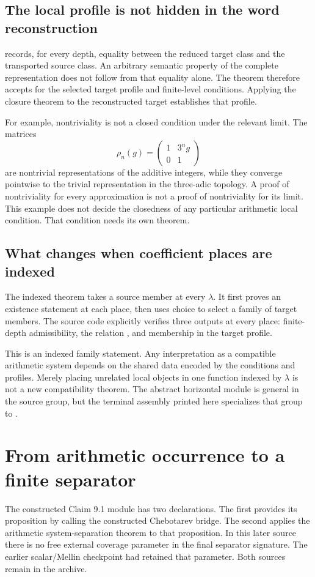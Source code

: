 \subsection{The local profile is not hidden in the word reconstruction}
 records, for every depth, equality between the reduced
target class and the transported source class. An arbitrary semantic property
of the complete representation does not follow from that equality alone.
The theorem therefore accepts  for the selected target
profile and finite-level conditions. Applying the closure theorem to the
reconstructed target establishes that profile.

For example, nontriviality is not a closed condition under the relevant limit.
The matrices
\[
 \rho_n(g)=\begin{pmatrix}1&3^n g\\0&1\end{pmatrix}
\]
are nontrivial representations of the additive integers, while they converge
pointwise to the trivial representation in the three-adic topology. A proof of
nontriviality for every approximation is not a proof of nontriviality for its limit.
This example does not decide the closedness of any particular arithmetic local
condition. That condition needs its own theorem.

\subsection{What changes when coefficient places are indexed}
The indexed theorem takes a source member at every $\lambda$. It first proves
an existence statement at each place, then uses choice to select a family of
target members. The source code explicitly verifies three outputs at every place:
finite-depth admissibility, the relation , and membership
in the target profile.

This is an indexed family statement. Any interpretation as a compatible
arithmetic system depends on the shared data encoded by the conditions and
profiles. Merely placing unrelated local objects in one function indexed by
$\lambda$ is not a new compatibility theorem. The abstract horizontal module is
general in the source group, but the terminal assembly printed here specializes
that group to .

\clearpage
\section{From arithmetic occurrence to a finite separator}
\label{sec:separator}
The constructed Claim 9.1 module has two declarations. The first provides its
 proposition by calling the constructed
Chebotarev bridge. The second applies the arithmetic system-separation theorem
to that proposition. In this later source there is no free external coverage
parameter in the final separator signature. The earlier scalar/Mellin checkpoint
had retained that parameter. Both sources remain in the archive.


